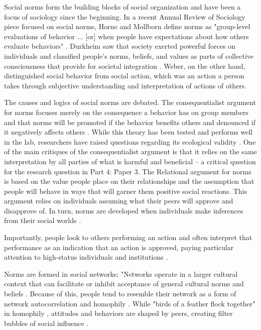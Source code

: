 Social norms form the building blocks of social organization and have
been a focus of sociology since the beginning. In a recent Annual Review
of Sociology piece focused on social norms, Horne and Mollborn define
norms as "group-level evaluations of behavior ... [or] when people
have expectations about how others evaluate behaviors" \citeyearpar[p. 468-69]{horneNormsIntegratedFramework2020}. Durkheim saw that society exerted powerful
forces on individuals and classified people's norms, beliefs, and values
as parts of collective consciousness that provide for societal
integration \citep{durkheimDivisionLaborSociety1933, durkheimSuicide1897}.
Weber, on the other hand,
distinguished social behavior from social action, which was an action a
person takes through subjective understanding and interpretation of
actions of others. %

The causes and logics of social norms are debated. The consequentialist
argument for norms focuses merely on the consequence a behavior has on
group members and that norms will be promoted if the behavior benefits
others and denounced if it negatively affects others \citep{ullmannmargalitEmergenceNorms1977}.
 While this theory has been tested and performs well in the lab,
researchers have raised questions regarding its ecological validity
\citep{horneNormsIntegratedFramework2020}. One of the main critiques of the
consequentialist argument is that it relies on the same interpretation
by all parties of what is harmful and beneficial -- a critical question
for the research question in Part 4: Paper 3. The Relational argument %
for norms is based on the value people place on their relationships and
the assumption that people will behave in ways that will garner them
positive social reactions. This argument relies on individuals assuming
what their peers will approve and disapprove of. In turn, norms are
developed when individuals make inferences from their social worlds
\citep{fryeCulturalMeaningsAggregation2017}.

Importantly, people look to others performing an action and often
interpret that performance as an indication that an action is approved,
paying particular attention to high-status individuals and institutions
\citep{robalinoPeerEffectsAdolescent2018, tankardEffectSupremeCourt2017}.

Norms are formed in social networks; "Networks operate in a larger
cultural context that can facilitate or inhibit acceptance of general
cultural norms and beliefs \citep{pescosolidoDurkheimSuicideReligion1989, whiteSocialStructureMultiple1976}. Because of this, people tend to resemble
their network as a form of network autocorrelation and homophily
\citep{dellapostaWhyLiberalsDrink2015}. While "birds of a feather flock
together" in homophily \citep{mcphersonBirdsFeatherHomophily2001},
attitudes and behaviors are shaped by peers, creating filter bubbles of
social influence \citep{dellapostaWhyLiberalsDrink2015}.

